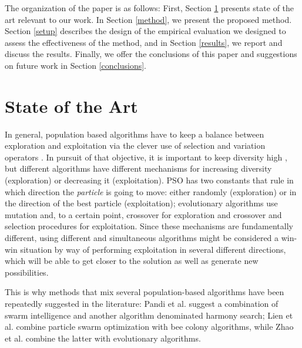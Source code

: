 \documentclass[runningheads]{llncs}
\begin{document}
The organization of the paper is as follows: First, Section \ref{soa} presents
state of the art relevant to our work. In Section \ref{method}, we present the
proposed method.  Section \ref{setup} describes the design of the empirical
evaluation we designed to assess the effectiveness of the method, and in Section
\ref{results}, we report and discuss the results. Finally, we offer the
conclusions of this paper and suggestions on future work in Section
\ref{conclusions}.


\section{State of the Art}
\label{soa}

In general, population based algorithms have to keep a balance between
exploration and exploitation via the clever use of selection and
variation operators \cite{vcrepinvsek2013exploration}. In pursuit of
that objective, it is important to keep diversity high
\cite{yuan2005importance}, but different algorithms have different
mechanisms for increasing diversity (exploration) or decreasing it
(exploitation). PSO has two constants that rule in which direction the
{\em particle} is going to move: either randomly (exploration) or in
the direction of the best particle (exploitation); evolutionary
algorithms use mutation and, to a certain point, crossover for
exploration and crossover and selection procedures for
exploitation. Since these mechanisms are fundamentally different,
using  different  and simultaneous algorithms might be
considered a win-win situation by way of performing exploitation in
several different directions, which will be able to
get closer to the solution as well as generate new possibilities.

This
is why methods that mix several population-based algorithms have been repeatedly
suggested in the literature: Pandi et al. \cite{pandi2011dynamic}
suggest a combination of swarm intelligence and another algorithm
denominated harmony search; Lien et al. \cite{lien2012hybrid} combine
particle swarm optimization with bee colony algorithms, while Zhao et
al. \cite{zhao2010hybrid} combine the latter with evolutionary
algorithms.
\end{document}
